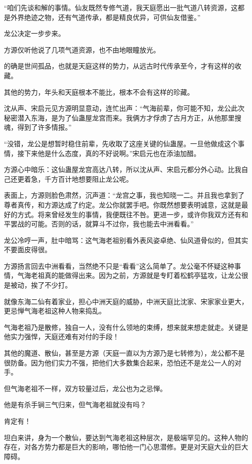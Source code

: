 \begin{this_body}
“咱们先谈和解的事情。仙友既然专修气道，我天庭愿出一批气道八转资源，这都是外界绝迹之物，还有气道传承，都是精良优异，可供仙友借鉴。”

龙公决定一步步来。

方源仅听他说了几项气道资源，也不由地眼瞳放光。

的确是世间孤品，也就是天庭这样的势力，从远古时代传承至今，才有这样的收藏。

其他的势力，年头和天庭根本不能比，根本不会有这样的珍藏。

沈从声、宋启元见方源明显意动，连忙出声：“气海前辈，你可能不知，龙公此次秘密潜入东海，是为了仙蛊屋龙宫而来。我俩方才俘虏了古月方正，从他那里搜魂，得到了许多情报。”

“没错，龙公是想暂时稳住前辈，先收取了这座关键的仙蛊屋。一旦他做成这个事情，接下来他是什么态度，真的不好说啊。”宋启元也在添油加醋。

方源心中暗乐：这仙蛊屋龙宫高达八转，所以沈从声、宋启元都分外心动。比我自己还更着急，千方百计地想要阻止龙公呢。

表面上，方源则脸色肃然，沉声道：“龙宫之事，我也知晓一二。并且我也拿到了尊者真传，和方源达成了约定。龙公你就罢手吧。你既然想要表明诚意，这就是最好的方式。将来曾经发生的事情，我便既往不咎。更进一步，或许你我双方还有和平罢战的可能。否则的话，就算斗不过你，我也能去中洲看看。”

龙公冷哼一声，肚中暗骂：这气海老祖别看外表风姿卓绝、仙风道骨似的，但其实不要面皮得很。

方源扬言回去中洲看看，当然绝不只是“看看”这么简单了。龙公毫不怀疑这种事情，气海老祖真的能做得出来。因为之前，方源就是专盯着松鹤亭猛攻，让龙公很是被动，挨了不少打。

就像东海二仙有着家业，担心中洲天庭的威胁，中洲天庭比沈家、宋家家业更大，更忌惮气海老祖这种人物来捣乱。

气海老祖乃是散修，独自一人，没有什么领地的束缚，想来就来想走就走。关键是他实力强悍，天庭还难有对付的手段！

其他的魔道、散仙，甚至是方源（天庭一直以为方源乃是七转修为），龙公都不是很防备。因为他们实力不强，把他们大多数集合起来，恐怕还不是龙公一人的对手。

但气海老祖不一样，双方较量过后，龙公也为之忌惮。

他是有杀手锏三气归来，但气海老祖就没有吗？

肯定有！

坦白来讲，身为一个散仙，要达到气海老祖这种层次，是极端罕见的。这种人物的存在，对各方势力都是巨大的影响，哪怕他一门心思潜修。更是对天庭大业的巨大障碍。


\end{this_body}
